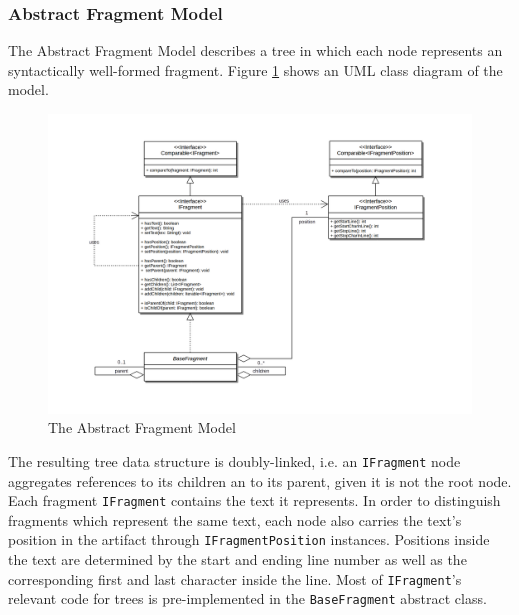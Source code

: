 \subsubsection{Abstract Fragment Model}
\label{subsubsection:AbstractFragmentModel}
The Abstract Fragment Model describes a tree in which each node represents an syntactically well-formed fragment.
Figure \ref{figure:FragmentModel} shows an \gls{UML} class diagram of the model.
\begin{figure}[h!]
\begin{center}
\includegraphics[width=\textwidth]{images/FragmentModel.png}
\end{center}
\caption{The Abstract Fragment Model}
\label{figure:FragmentModel}
\end{figure}
The resulting tree data structure is doubly-linked, i.e. an \texttt{IFragment} node aggregates references to its children an to its parent, given it is not the root node.
Each fragment \texttt{IFragment} contains the text it represents.
In order to distinguish fragments which represent the same text, each node also carries the text's position in the artifact through \texttt{IFragmentPosition} instances.
Positions inside the text are determined by the start and ending line number as well as the corresponding first and last character inside the line.
Most of \texttt{IFragment}'s relevant code for trees is pre-implemented in the \texttt{BaseFragment} abstract class.

